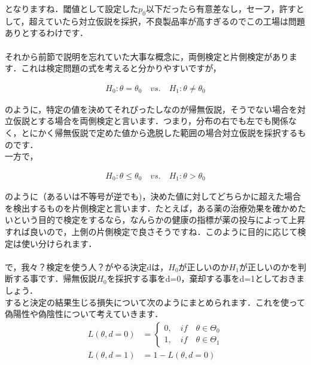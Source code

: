 \documentclass[11pt,a4paper,uplatex]{ujreport} 	%
\begin{document}
となりますね．閾値として設定した$p_0$以下だったら有意差なし，セーフ，許すとして，超えていたら対立仮説を採択，不良製品率が高すぎるのでこの工場は問題ありとするわけです．\\
\\

それから前節で説明を忘れていた大事な概念に，両側検定と片側検定があります．これは検定問題の式を考えると分かりやすいですが，

\begin{align}
  H_0:\theta = \theta_0\quad vs. \quad H_1:\theta \neq \theta_0
\end{align}

のように，特定の値を決めてそれぴったしなのが帰無仮説，そうでない場合を対立仮説とする場合を両側検定と言います．つまり，分布の右でも左でも関係なく，とにかく帰無仮説で定めた値から逸脱した範囲の場合対立仮説を採択するものです．\\

一方で，

\begin{align}
  H_0:\theta \leq \theta_0 \quad vs. \quad H_1 : \theta > \theta_0
\end{align}

のように（あるいは不等号が逆でも)，決めた値に対してどちらかに超えた場合を検出するものを片側検定と言います．たとえば，ある薬の治療効果を確かめたいという目的で検定をするなら，なんらかの健康の指標が薬の投与によって上昇すれば良いので，上側の片側検定で良さそうですね．このように目的に応じて検定は使い分けられます．\\\\

で，我々？検定を使う人？がやる決定dは，$H_0$が正しいのか$H_1$が正しいのかを判断する事です．帰無仮説$H_0$を採択する事をd=0，棄却する事をd=1としておきましょう．\\

すると決定の結果生じる損失について次のようにまとめられます．これを使って偽陽性や偽陰性について考えていきます．\\


\begin{align}
  L(\theta, d=0) &= \left\{
    \begin{array}{l}
    0, \quad if \quad \theta \in \Theta_0\\
    1, \quad if \quad \theta \in \Theta_1
    \end{array}
  \right.\nonumber \\
  L(\theta, d=1) &= 1-L(\theta, d=0) 
  \label{eq:cost}
\end{align}
\end{document}
